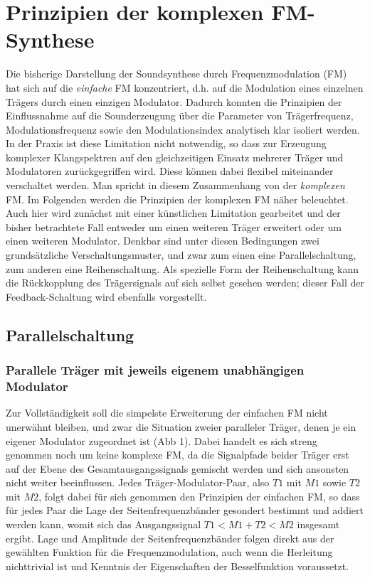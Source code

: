 \section{Prinzipien der komplexen FM-Synthese}
\label{PrinzipKomplexFM}

Die bisherige Darstellung der Soundsynthese durch Frequenzmodulation (FM) hat sich auf die \textit{einfache} FM konzentriert, d.h. auf die Modulation eines einzelnen Trägers durch einen einzigen Modulator. Dadurch konnten die Prinzipien der Einflussnahme auf die Sounderzeugung über die Parameter von Trägerfrequenz, Modulationsfrequenz sowie den Modulationsindex analytisch klar isoliert werden. In der Praxis ist diese Limitation nicht notwendig, so dass zur Erzeugung komplexer Klangspektren auf den gleichzeitigen Einsatz mehrerer Träger und Modulatoren zurückgegriffen wird. Diese können dabei flexibel miteinander verschaltet werden. Man spricht in diesem Zusammenhang von der \textit{komplexen} FM. Im Folgenden werden die Prinzipien der komplexen FM näher beleuchtet. Auch hier wird zunächst mit einer künstlichen Limitation gearbeitet und der bisher betrachtete Fall entweder um einen weiteren Träger erweitert oder um einen weiteren Modulator. Denkbar sind unter diesen Bedingungen zwei grundsätzliche Verschaltungsmuster, und zwar zum einen eine Parallelschaltung, zum anderen eine Reihenschaltung. Als spezielle Form der Reihenschaltung kann die Rückkopplung des Trägersignals auf sich selbst gesehen werden; dieser Fall der Feedback-Schaltung wird ebenfalls vorgestellt. 

\subsection{Parallelschaltung}

\subsubsection{Parallele Träger mit jeweils eigenem unabhängigen Modulator}

Zur Vollständigkeit soll die simpelste Erweiterung der einfachen FM nicht unerwähnt bleiben, und zwar die Situation zweier paralleler Träger, denen je ein eigener Modulator zugeordnet ist (Abb 1). Dabei handelt es sich streng genommen noch um keine komplexe FM, da die Signalpfade beider Träger erst auf der Ebene des Gesamtausgangssignals gemischt werden und sich ansonsten nicht weiter beeinflussen. Jedes Träger-Modulator-Paar, also $T1$ mit $M1$ sowie $T2$ mit $M2$, folgt dabei für sich genommen den Prinzipien der einfachen FM, so dass für jedes Paar die Lage der Seitenfrequenzbänder gesondert bestimmt und addiert werden kann, womit sich das Ausgangssignal $T1<M1 + T2<M2$ insgesamt ergibt. Lage und Amplitude der Seitenfrequenzbänder folgen direkt aus der gewählten Funktion für die Frequenzmodulation, auch wenn die Herleitung nichttrivial ist und Kenntnis der Eigenschaften der Besselfunktion voraussetzt. 

